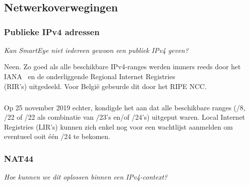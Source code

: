 \chapter{}%
\label{ch:stand-van-zaken}



\section{Netwerkoverwegingen}

\subsection{Publieke IPv4 adressen}
\emph{Kan SmartEye niet iedereen gewoon een publiek IPv4 geven? }

Neen. Zo goed als alle beschikbare IPv4-ranges werden immers reeds door het IANA~\autocite{ICANN2012} en de onderliggende Regional Internet Registries\\\autocite{Gerich1993} (RIR’s) uitgedeeld. Voor België gebeurde dit door het RIPE NCC.

\paragraph{}
Op 25 november 2019 echter, kondigde het \textcite{RIPE_NCC2019}  aan dat alle beschikbare ranges (/8, /22 of /22 als combinatie van /23’s en/of /24’s) uitgeput waren. Local Internet Registries (LIR’s) kunnen zich enkel nog voor een wachtlijst aanmelden om eventueel ooit één /24 te bekomen.

\subsection{NAT44}
\emph{Hoe kunnen we dit oplossen binnen een IPv4-context?}

